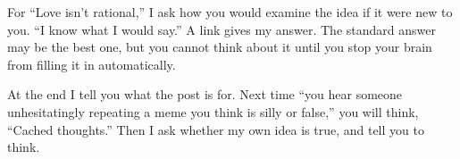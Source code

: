 For ``Love isn't rational,'' I ask how you would examine the idea if it were new to you. ``I know what I would say.'' A link gives my answer. The standard answer may be the best one, but you cannot think about it until you stop your brain from filling it in automatically.

At the end I tell you what the post is for. Next time ``you hear someone unhesitatingly repeating a meme you think is silly or false,'' you will think, ``Cached thoughts.''  Then I ask whether my own idea is true, and tell you to think.
